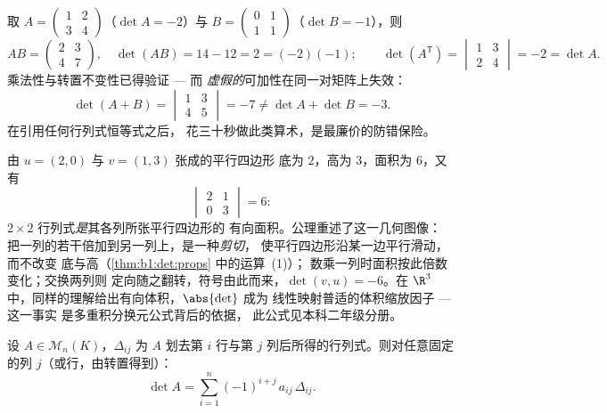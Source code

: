 \begin{example}[在数值上验证法则]
\label{ex:b1:det:rulescheck}
取 $A = \begin{pmatrix} 1 & 2\\ 3 & 4\end{pmatrix}$（$\det A =
-2$）与 $B = \begin{pmatrix} 0 & 1\\ 1 & 1\end{pmatrix}$（$\det
B = -1$），则
\[
AB = \begin{pmatrix} 2 & 3\\ 4 & 7\end{pmatrix},
\quad \det(AB) = 14 - 12 = 2 = (-2)(-1) ;
\qquad
\det(A^{\mathsf T}) = \begin{vmatrix} 1 & 3\\ 2 & 4
\end{vmatrix} = -2 = \det A .
\]
乘法性与转置不变性已得验证 --- 而
\emph{虚假的}可加性在同一对矩阵上失效：
\[
\det(A + B) = \begin{vmatrix} 1 & 3\\ 4 & 5\end{vmatrix} = -7
\neq \det A + \det B = -3 .
\]
在引用任何行列式恒等式之后，
花三十秒做此类算术，是最廉价的防错保险。
\end{example}

\begin{example}[行列式作为面积]
\label{ex:b1:det:area}
由 $u = (2, 0)$ 与 $v = (1, 3)$ 张成的平行四边形
底为 $2$，高为 $3$，面积为 $6$，又有
\[
\begin{vmatrix} 2 & 1\\ 0 & 3\end{vmatrix} = 6 :
\]
$2\times2$ 行列式\emph{是}其各列所张平行四边形的
有向面积。公理重述了这一几何图像：
把一列的若干倍加到另一列上，是一种\emph{剪切}，
使平行四边形沿某一边平行滑动，而不改变
底与高（\cref{thm:b1:det:props} 中的运算~(1)）；
数乘一列时面积按此倍数变化；交换两列则
定向随之翻转，符号由此而来，$\det(v, u) = -6$。在 $\R^3$
中，同样的理解给出有向体积，$\abs{\det}$ 成为
线性映射普适的体积缩放因子 --- 这一事实
是多重积分换元公式背后的依据，
此公式见本科二年级分册。
\end{example}

\begin{theorem}[余子式展开]\label{thm:b1:det:cofactor}
设 $A \in \mathcal{M}_n(K)$，$\Delta_{ij}$ 为
$A$ 划去第 $i$ 行与第 $j$ 列后所得的行列式。则对任意固定的列
$j$（或行，由转置得到）：
\[
\det A = \sum_{i=1}^{n} (-1)^{i+j}\, a_{ij}\, \Delta_{ij} .
\]
\end{theorem}
\admitted


